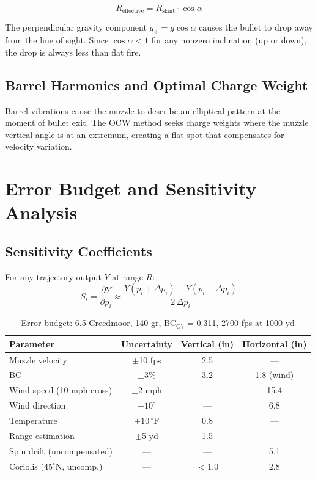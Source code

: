\documentclass[11pt,twoside,openright]{report}
\newcommand{\degF}{{}^{\circ}\mathrm{F}}
\begin{document}
\begin{equation}
  R_{\mathrm{effective}} = R_{\mathrm{slant}} \cdot \cos\alpha
  \label{eq:riflemans_rule}
\end{equation}

The perpendicular gravity component $g_{\perp} = g\cos\alpha$ causes the bullet to drop away from the line of sight. Since $\cos\alpha < 1$ for any nonzero inclination (up or down), the drop is always less than flat fire.

\section{Barrel Harmonics and Optimal Charge Weight}

Barrel vibrations cause the muzzle to describe an elliptical pattern at the moment of bullet exit. The OCW method seeks charge weights where the muzzle vertical angle is at an extremum, creating a flat spot that compensates for velocity variation.


\chapter{Error Budget and Sensitivity Analysis}
\label{ch:sensitivity}

\section{Sensitivity Coefficients}

For any trajectory output $Y$ at range $R$:
\begin{equation}
  S_i = \frac{\partial Y}{\partial p_i} \approx \frac{Y(p_i + \Delta p_i) - Y(p_i - \Delta p_i)}{2\,\Delta p_i}
  \label{eq:sensitivity}
\end{equation}

\begin{table}[H]
\centering
\caption{Error budget: 6.5 Creedmoor, 140 gr, BC$_{\text{G7}}$ = 0.311, 2700 fps at 1000 yd}
\label{tab:error_budget}
\small
\begin{tabular}{@{}lccc@{}}
\toprule
\textbf{Parameter} & \textbf{Uncertainty} & \textbf{Vertical (in)} & \textbf{Horizontal (in)} \\
\midrule
Muzzle velocity & $\pm$10 fps & 2.5 & --- \\
BC & $\pm$3\% & 3.2 & 1.8 (wind) \\
Wind speed (10 mph cross) & $\pm$2 mph & --- & 15.4 \\
Wind direction & $\pm 10^{\circ}$ & --- & 6.8 \\
Temperature & $\pm 10\,\degF$ & 0.8 & --- \\
Range estimation & $\pm$5 yd & 1.5 & --- \\
Spin drift (uncompensated) & --- & --- & 5.1 \\
Coriolis ($45^{\circ}$N, uncomp.) & --- & $<$1.0 & 2.8 \\
\bottomrule
\end{tabular}
\end{table}
\end{document}
